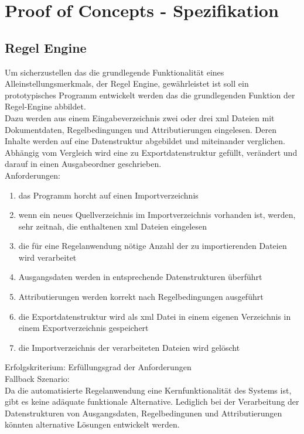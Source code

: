 \documentclass[11pt,oneside,a4paper,notitlepage]{article}
\begin{document}
\begin{comment}
Die Proof of Concepts lassen sich evtl. aus den Risiken ableiten. Für die Spezifizierung der Proof of Concepts müssen jeweils Exit- und Failkriterien beschrieben werden. D.h. es werden konkrete Bedingungen spezifiziert, die besagen in welchem Fall ein Proof of Concept als "erfolgreich" oder als "nicht erfolgreich" gilt. Falls ein Proof of Concept gescheitert ist, muss man sich im Vorfeld Alternativen/Fallbacks überlegen, die anstelle der ursprünglich angedachten Vorgehensweise herangezogen werden könnten. Die Durchführung eines Proof of Concepts muss dokumentiert werden. 
\end{comment}


%
\section{Proof of Concepts - Spezifikation}
%
%
\subsection{Regel Engine}

Um sicherzustellen das die grundlegende Funktionalität eines Alleinstellungsmerkmals, der Regel Engine, gewährleistet ist soll ein prototypisches Programm entwickelt werden das die grundlegenden Funktion der Regel-Engine abbildet.\\
Dazu werden aus einem Eingabeverzeichnis zwei oder drei xml Dateien mit Dokumentdaten, Regelbedingungen und Attributierungen eingelesen. Deren Inhalte werden auf eine Datenstruktur abgebildet und miteinander verglichen. Abhängig vom Vergleich wird eine zu Exportdatenstruktur gefüllt, verändert und darauf in einen Ausgabeordner geschrieben.
\\
Anforderungen:
\begin{enumerate}
\item das Programm horcht auf einen Importverzeichnis
\item wenn ein neues Quellverzeichnis im Importverzeichnis vorhanden ist, werden, sehr zeitnah, die enthaltenen xml Dateien eingelesen
\item die für eine Regelanwendung nötige Anzahl der zu importierenden Dateien wird verarbeitet
\item Ausgangsdaten werden in entsprechende Datenstrukturen überführt
\item Attributierungen werden korrekt nach Regelbedingungen ausgeführt
\item die Exportdatenstruktur wird als xml Datei in einem eigenen Verzeichnis in einem Exportverzeichnis gespeichert
\item die Importverzeichnis der verarbeiteten Dateien wird gelöscht
\end{enumerate}
\noindent
Erfolgskriterium: Erfüllungsgrad der Anforderungen\\
Fallback Szenario:\\
Da die automatisierte Regelanwendung eine Kernfunktionalität des Systems ist, gibt es keine adäquate funktionale Alternative. Lediglich bei der Verarbeitung der Datenstrukturen von Ausgangsdaten, Regelbedingunen und Attributierungen könnten alternative Lösungen entwickelt werden.
%
%
\end{document}
